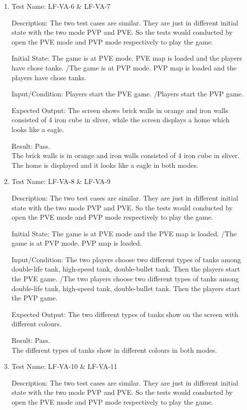 \documentclass[12pt, titlepage]{article}
\begin{document}
\begin{enumerate}
\item{Test Name: LF-VA-6 \& LF-VA-7\\}

Description: The two test cases are similar. They are just in different initial state with the two mode PVP and PVE. So the tests would conducted by open the PVE mode and PVP mode respectively to play the game.

Initial State: The game is at PVE mode. PVE map is loaded and the players have chose tanks. /The game is at PVP mode. PVP map is loaded and the players have chose tanks.

Input/Condition: Players start the PVE game. /Players start the PVP game.

Expected Output: The screen shows brick walls in orange and iron walls consisted of 4 iron cube in sliver, while the screen displays a home which looks like a eagle.

Result: Pass. \\The brick walls is in orange and iron walls consisted of 4 iron cube in sliver. The home is displayed and it looks like a eagle in both modes.

\item{Test Name: LF-VA-8 \& LF-VA-9\\}

Description: The two test cases are similar. They are just in different initial state with the two mode PVP and PVE. So the tests would conducted by open the PVE mode and PVP mode respectively to play the game.

Initial State: The game is at PVE mode and the PVE map is loaded. /The game is at PVP mode. PVP map is loaded.

Input/Condition: The two players choose two different types of tanks among double-life tank, high-speed tank, double-bullet tank. Then the players start the PVE game. /The two players choose two different types of tanks among double-life tank, high-speed tank, double-bullet tank. Then the players start the PVP game.

Expected Output: The two different types of tanks show on the screen with different colours.

Result: Pass. \\The different types of tanks show in different colours in both modes.

\item{Test Name: LF-VA-10 \& LF-VA-11\\}

Description: The two test cases are similar. They are just in different initial state with the two mode PVP and PVE. So the tests would conducted by open the PVE mode and PVP mode respectively to play the game.


\end{enumerate}
\end{document}
